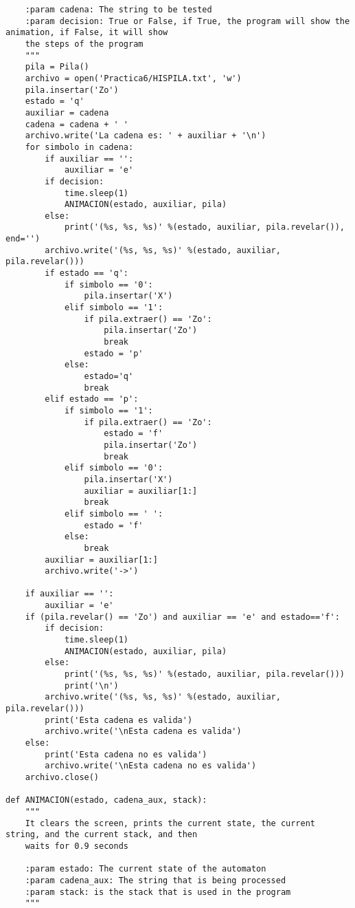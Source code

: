 \documentclass{article}
\begin{document}
\begin{lstlisting}
    :param cadena: The string to be tested
    :param decision: True or False, if True, the program will show the animation, if False, it will show
    the steps of the program
    """
    pila = Pila()
    archivo = open('Practica6/HISPILA.txt', 'w')
    pila.insertar('Zo')
    estado = 'q'
    auxiliar = cadena
    cadena = cadena + ' '
    archivo.write('La cadena es: ' + auxiliar + '\n')
    for simbolo in cadena:
        if auxiliar == '':
            auxiliar = 'e'
        if decision:
            time.sleep(1)
            ANIMACION(estado, auxiliar, pila)
        else:
            print('(%s, %s, %s)' %(estado, auxiliar, pila.revelar()), end='')
        archivo.write('(%s, %s, %s)' %(estado, auxiliar, pila.revelar()))
        if estado == 'q':
            if simbolo == '0':
                pila.insertar('X')
            elif simbolo == '1':
                if pila.extraer() == 'Zo':
                    pila.insertar('Zo')
                    break
                estado = 'p'
            else:
                estado='q'
                break
        elif estado == 'p':
            if simbolo == '1':
                if pila.extraer() == 'Zo':
                    estado = 'f'
                    pila.insertar('Zo')
                    break
            elif simbolo == '0':
                pila.insertar('X')
                auxiliar = auxiliar[1:]
                break
            elif simbolo == ' ':
                estado = 'f'
            else:
                break
        auxiliar = auxiliar[1:]
        archivo.write('->')

    if auxiliar == '':
        auxiliar = 'e'
    if (pila.revelar() == 'Zo') and auxiliar == 'e' and estado=='f':
        if decision:
            time.sleep(1)
            ANIMACION(estado, auxiliar, pila)
        else:
            print('(%s, %s, %s)' %(estado, auxiliar, pila.revelar()))
            print('\n')
        archivo.write('(%s, %s, %s)' %(estado, auxiliar, pila.revelar()))
        print('Esta cadena es valida')
        archivo.write('\nEsta cadena es valida')
    else:
        print('Esta cadena no es valida')
        archivo.write('\nEsta cadena no es valida')
    archivo.close()

def ANIMACION(estado, cadena_aux, stack):
    """
    It clears the screen, prints the current state, the current string, and the current stack, and then
    waits for 0.9 seconds
    
    :param estado: The current state of the automaton
    :param cadena_aux: The string that is being processed
    :param stack: is the stack that is used in the program
    """
    

\end{lstlisting}
\end{document}
